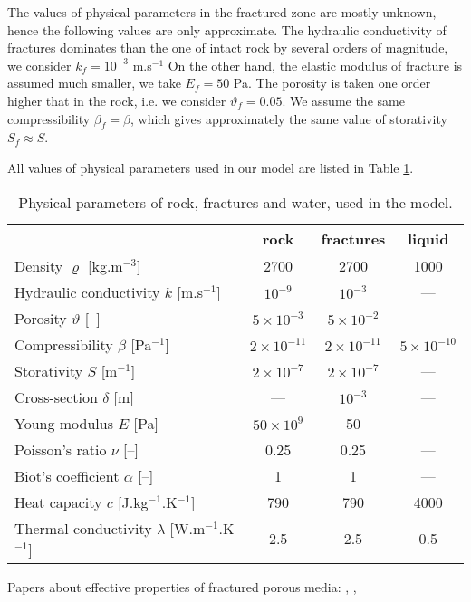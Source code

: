 \documentclass{article}
\begin{document}
The values of physical parameters in the fractured zone are mostly unknown, hence the following values are only approximate.
The hydraulic conductivity of fractures dominates than the one of intact rock by several orders of magnitude, we consider $k_f=10^{-3}$ m.s${}^{-1}$
On the other hand, the elastic modulus of fracture is assumed much smaller, we take $E_f=50$ Pa.
The porosity is taken one order higher that in the rock, i.e. we consider $\vartheta_f=0.05$.
We assume the same compressibility $\beta_f=\beta$, which gives approximately the same value of storativity $S_f\approx S$.

All values of physical parameters used in our model are listed in Table \ref{tab:params}.

\begin{table}
\centering
\begin{tabular}{|l|c|c|c|}
\hline
 & rock & fractures & liquid\\\hline
Density $\varrho$ [kg.m${}^{-3}$] & 2700 & 2700 & 1000 \\
Hydraulic conductivity $k$ [m.s${}^{-1}$] & $10^{-9}$ \cite{sperl-trckova} & $10^{-3}$ & ---\\
Porosity $\vartheta$ [--] & $5\times10^{-3}$ & $5\times10^{-2}$ & --- \\
Compressibility $\beta$ [Pa${}^{-1}$] & $2\times10^{-11}$ & $2\times10^{-11}$ & $5\times10^{-10}$ \\
Storativity $S$ [m${}^{-1}$] & $2\times10^{-7}$ & $2\times10^{-7}$ & --- \\
Cross-section $\delta$ [m] & --- & $10^{-3}$ & --- \\
\hline
Young modulus $E$ [Pa] & $50\times10^9$ & 50 & --- \\
Poisson's ratio $\nu$ [--] & 0.25 & 0.25 & --- \\
Biot's coefficient $\alpha$ [--] & 1 & 1 & --- \\
\hline
Heat capacity $c$ [J.kg${}^{-1}$.K${}^{-1}$] & 790 & 790 & 4000 \\
Thermal conductivity $\lambda$ [W.m${}^{-1}$.K${}^{-1}$] & 2.5 & 2.5 & 0.5 \\
\hline
\end{tabular}
\caption{Physical parameters of rock, fractures and water, used in the model.}
\label{tab:params}
\end{table}

Papers about effective properties of fractured porous media: \cite{Snow1969}, \cite{Bonnet2001}, \cite{Olson2003}
\end{document}
